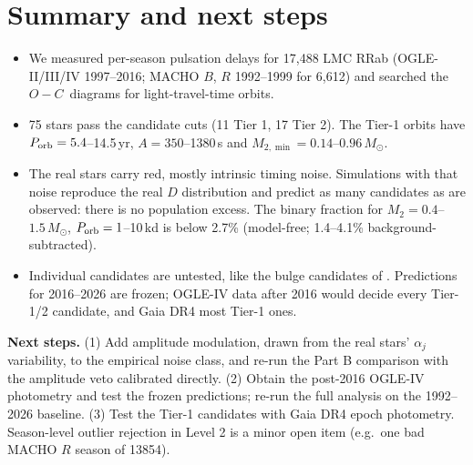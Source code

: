 \documentclass[11pt]{article}
\newcommand{\Msun}{\ensuremath{M_\odot}}
\newcommand{\OC}{\ensuremath{O{-}C}}
\begin{document}
\section{Summary and next steps}\label{sec:summary}
\begin{itemize}[leftmargin=*]
\item We measured per-season pulsation delays for 17{,}488 LMC RRab (OGLE-II/III/IV 1997--2016; MACHO $B$, $R$ 1992--1999 for
6{,}612) and searched the \OC\ diagrams for light-travel-time orbits.
\item 75 stars pass the candidate cuts (11 Tier 1, 17 Tier 2). The Tier-1 orbits have $P_{\rm orb}=5.4$--14.5\,yr, $A=350$--1380\,s
and $M_{2,\min}=0.14$--$0.96\,\Msun$.
\item The real stars carry red, mostly intrinsic timing noise. Simulations with that noise reproduce the real $D$ distribution
and predict as many candidates as are observed: there is no population excess. The binary fraction for
$M_2=0.4$--$1.5\,\Msun$, $P_{\rm orb}=1$--10\,kd is below 2.7\% (model-free; 1.4--4.1\% background-subtracted).
\item Individual candidates are untested, like the bulge candidates of \citet{Hajdu2021}. Predictions for 2016--2026 are frozen;
OGLE-IV data after 2016 would decide every Tier-1/2 candidate, and Gaia DR4 most Tier-1 ones.
\end{itemize}
\textbf{Next steps.} (1) Add amplitude modulation, drawn from the real stars' $\alpha_j$ variability, to the empirical noise class,
and re-run the Part B comparison with the amplitude veto calibrated directly. (2) Obtain the post-2016 OGLE-IV photometry and
test the frozen predictions; re-run the full analysis on the 1992--2026 baseline. (3) Test the Tier-1 candidates with Gaia DR4
epoch photometry. Season-level outlier rejection in Level 2 is a minor open item (e.g.\ one bad MACHO $R$ season of 13854).
\end{document}
